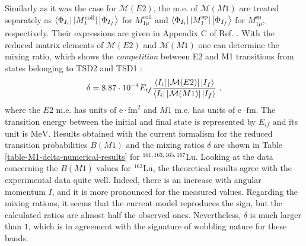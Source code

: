 Similarly as it was the case for $\mathcal{M}(E2)$, the m.e. of $\mathcal{M}(M1)$ are treated separately as $\bra{\Phi_{I_i}}|M_1^\text{coll}|\ket{\Phi_{I_f}}$ for $M_{1\mu}^\text{coll}$ and $\bra{\Phi_{I_i}}|M_1^\text{sp}|\ket{\Phi_{I_f}}$ for $M_{1\mu}^\text{sp}$, respectively. Their expressions are given in Appendix C of Ref. \cite{raduta2017semiclassical}. With the reduced matrix elements of $\mathcal{M}(E2)$ and $\mathcal{M}(M1)$ one can determine the mixing ratio, which shows the \emph{competition} between E2 and M1 transitions from states belonging to TSD2 and TSD1 \cite{krane1970determination,toki1975asymmetric}:
\begin{align}
    \delta=8.87\cdot 10^{-4}E_{if}\frac{\bra{I_i}|\mathcal{M}(E2)|\ket{I_f}}{\bra{I_i}|\mathcal{M}(M1)|\ket{I_f}}\ ,
    \label{mixing-ratio-Lu-isotopes}
\end{align}
where the $E2$ m.e. has units of $\mathrm{e}\cdot\text{fm}^2$ and $M1$ m.e. has units of $\mathrm{e}\cdot\text{fm}$. The transition energy between the initial and final state is represented by $E_{if}$ and its unit is $\text{MeV}$. Results obtained with the current formalism for the reduced transition probabilities $B(M1)$ and the mixing ratios $\delta$ are shown in Table \ref{table-M1-delta-numerical-results} for $^{161,163,165,167}$Lu. Looking at the data concerning the $B(M1)$ values for $^{163}$Lu, the theoretical results agree with the experimental data quite well. Indeed, there is an increase with angular momentum $I$, and it is more pronounced for the measured values. Regarding the mixing rations, it seems that the current model reproduces the sign, but the calculated ratios are almost half the observed ones. Nevertheless, $\delta$ is much larger than $1$, which is in agreement with the signature of wobbling nature for these bands.
